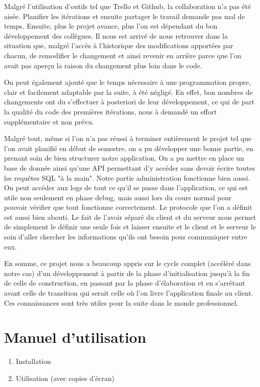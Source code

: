\documentclass[a4paper,12pt]{article}
\begin{document}
	Malgré l'utilisation d'outils tel que Trello et Github, la collaboration n'a pas été aisée. Planifier les itérations et ensuite partager le travail demande pas mal de temps. Ensuite, plus le projet avance, plus l'on est dépendant du bon développement des collègues. Il nous est arrivé de nous retrouver dans la situation que, malgré l'accès à l'historique des modifications apportées par chacun, de remodifier le changement et ainsi revenir en arrière parce que l'on avait pas aperçu la raison du changement plus loin dans le code.
	
	On peut également ajouté que le temps nécessaire à une programmation propre, clair et facilement adaptable par la suite, à été négligé. En effet, bon nombres de changements ont du s'effectuer à posteriori de leur développement, ce qui de part la qualité du code des premières itérations, nous à demandé un effort supplémentaire et non prévu. 
	
	Malgré tout, même si l'on n'a pas réussi à terminer entièrement le projet tel que l'on avait planifié en début de semestre, on a pu développer une bonne partie, en prenant soin de bien structurer notre application. On a pu mettre en place un base de donnée ainsi qu'une API permettant d'y accéder sans devoir écrire toutes les requêtes SQL "à la main". Notre partie administration fonctionne bien aussi. On peut accéder aux logs de tout ce qu'il se passe dans l'application, ce qui est utile non seulement en phase debug, mais aussi lors du cours normal pour pouvoir vérifier que tout fonctionne correctement. Le protocole que l'on a définit est aussi bien abouti. Le fait de l'avoir séparé du client et du serveur nous permet de simplement le définir une seule fois et laisser ensuite et le client et le serveur le soin d'aller chercher les informations qu'ils ont besoin pour communiquer entre eux.
	
	En somme, ce projet nous a beaucoup appris sur le cycle complet (accéléré dans notre cas) d'un développement à partir de la phase d'initialisation jusqu'à la fin de celle de construction, en passant par la phase d'élaboration et en s'arrêtant avant celle de transition qui serait celle où l'on livre l'application finale au client. Ces connaissances sont très utiles pour la suite dans le monde professionnel.
	
	\appendix
	\section{Manuel d'utilisation} \label{app:manuelUtil}
	\begin{enumerate}
		\item Installation
		\item Utilisation (avec copies d'écran)
	\end{enumerate}
\end{document}
